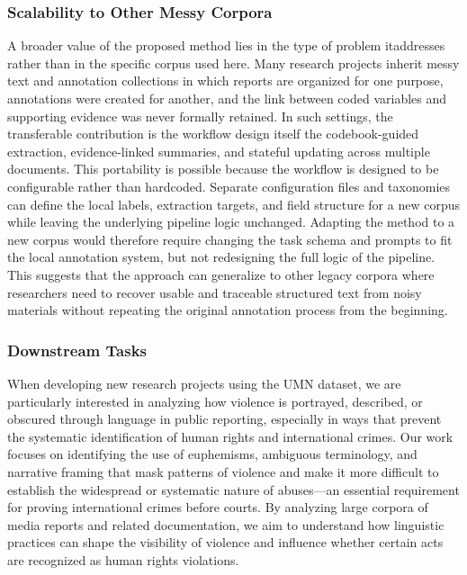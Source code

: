 \documentclass{article}
\begin{document}
\subsubsection{Scalability to Other Messy
Corpora}\label{scalability-to-other-messy-corpora}

A broader value of the proposed method lies in the type of problem itaddresses rather than in the specific corpus used here. Many research projects inherit messy text and annotation collections in which reports are organized for one purpose, annotations were created for another, and the link between coded variables and supporting evidence was never formally retained. In such settings, the transferable contribution is the workflow design itself the codebook-guided extraction, evidence-linked summaries, and stateful updating across multiple documents. This portability is possible because the workflow is designed to be configurable rather than hardcoded. Separate configuration files and taxonomies can define the local labels, extraction targets, and field structure for a new corpus while leaving the underlying pipeline logic unchanged. Adapting the method to a new corpus would therefore require changing the task schema and prompts to fit the local annotation system, but not redesigning the full logic of the pipeline. This suggests that the approach can generalize to other legacy corpora where researchers need to recover usable and traceable structured text from noisy materials without repeating the original annotation process from the beginning.

\subsubsection{Downstream Tasks}\label{downstream-tasks}

When developing new research projects using the UMN dataset, we are particularly interested in analyzing how violence is portrayed, described, or obscured through language in public reporting, especially in ways that prevent the systematic identification of human rights and international crimes. Our work focuses on identifying the use of euphemisms, ambiguous terminology, and narrative framing that mask patterns of violence and make it more difficult to establish the widespread or systematic nature of abuses—an essential requirement for proving international crimes before courts. By analyzing large corpora of media reports and related documentation, we aim to understand how linguistic practices can shape the visibility of violence and influence whether certain acts are recognized as human rights violations.
\end{document}
